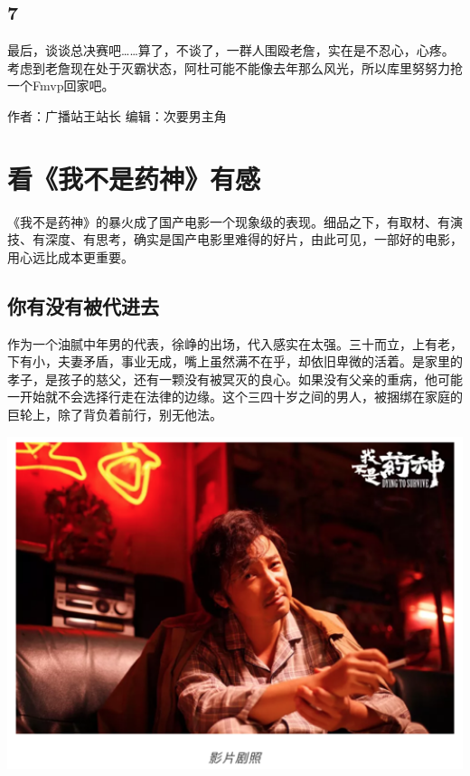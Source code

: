 \documentclass[]{book}
\begin{document}
\hypertarget{section-5}{%
\subsection{7}\label{section-5}}

最后，谈谈总决赛吧\ldots{}\ldots{}算了，不谈了，一群人围殴老詹，实在是不忍心，心疼。考虑到老詹现在处于灭霸状态，阿杜可能不能像去年那么风光，所以库里努努力抢一个Fmvp回家吧。

作者：广播站王站长
编辑：次要男主角

\hypertarget{ux770bux6211ux4e0dux662fux836fux795eux6709ux611f}{%
\section{看《我不是药神》有感}\label{ux770bux6211ux4e0dux662fux836fux795eux6709ux611f}}

《我不是药神》的暴火成了国产电影一个现象级的表现。细品之下，有取材、有演技、有深度、有思考，确实是国产电影里难得的好片，由此可见，一部好的电影，用心远比成本更重要。

\hypertarget{ux4f60ux6709ux6ca1ux6709ux88abux4ee3ux8fdbux53bb}{%
\subsection{你有没有被代进去}\label{ux4f60ux6709ux6ca1ux6709ux88abux4ee3ux8fdbux53bb}}

作为一个油腻中年男的代表，徐峥的出场，代入感实在太强。三十而立，上有老，下有小，夫妻矛盾，事业无成，嘴上虽然满不在乎，却依旧卑微的活着。是家里的孝子，是孩子的慈父，还有一颗没有被冥灭的良心。如果没有父亲的重病，他可能一开始就不会选择行走在法律的边缘。这个三四十岁之间的男人，被捆绑在家庭的巨轮上，除了背负着前行，别无他法。

\includegraphics[width=6.67in]{images/yaoshen1}
\end{document}
